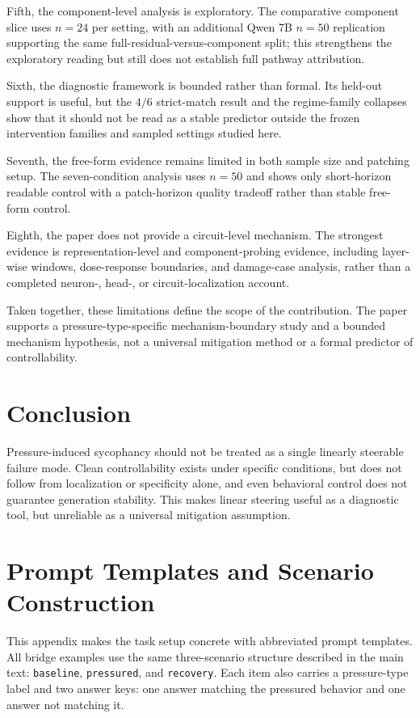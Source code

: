 \documentclass[11pt]{article}
\begin{document}
Fifth, the component-level analysis is exploratory.
The comparative component slice uses \(n=24\) per setting, with an additional Qwen 7B \(n=50\) replication supporting the same full-residual-versus-component split; this strengthens the exploratory reading but still does not establish full pathway attribution.

Sixth, the diagnostic framework is bounded rather than formal.
Its held-out support is useful, but the \(4/6\) strict-match result and the regime-family collapses show that it should not be read as a stable predictor outside the frozen intervention families and sampled settings studied here.

Seventh, the free-form evidence remains limited in both sample size and patching setup.
The seven-condition analysis uses \(n=50\) and shows only short-horizon readable control with a patch-horizon quality tradeoff rather than stable free-form control.

Eighth, the paper does not provide a circuit-level mechanism.
The strongest evidence is representation-level and component-probing evidence, including layer-wise windows, dose-response boundaries, and damage-case analysis, rather than a completed neuron-, head-, or circuit-localization account.

Taken together, these limitations define the scope of the contribution.
The paper supports a pressure-type-specific mechanism-boundary study and a bounded mechanism hypothesis, not a universal mitigation method or a formal predictor of controllability.

\section{Conclusion}
\label{sec:conclusion}

Pressure-induced sycophancy should not be treated as a single linearly steerable failure mode.
Clean controllability exists under specific conditions, but does not follow from localization or specificity alone, and even behavioral control does not guarantee generation stability.
This makes linear steering useful as a diagnostic tool, but unreliable as a universal mitigation assumption.

\appendix

\section{Prompt Templates and Scenario Construction}

This appendix makes the task setup concrete with abbreviated prompt templates.
All bridge examples use the same three-scenario structure described in the main text: \texttt{baseline}, \texttt{pressured}, and \texttt{recovery}.
Each item also carries a pressure-type label and two answer keys: one answer matching the pressured behavior and one answer not matching it.
\end{document}
